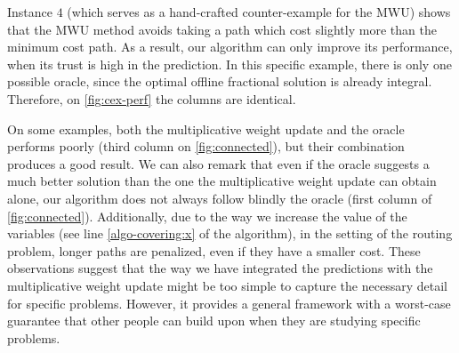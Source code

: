 Instance $4$ (which serves as a hand-crafted counter-example for the MWU) shows that the MWU method avoids taking a path which cost slightly more than the minimum cost path. As a result, our algorithm can only improve its performance, when its trust is high in the prediction. In this specific example, there is only one possible oracle, since the optimal offline fractional solution is already integral. Therefore, on \cref{fig:cex-perf} the columns are identical.

On some examples, both the multiplicative weight update and the oracle performs poorly (third column on \cref{fig:connected}), but their combination produces a good result. We can also remark that even if the oracle suggests a much better solution than the one the multiplicative weight update can obtain alone, our algorithm does not always follow blindly the oracle (first column of \cref{fig:connected}). Additionally, due to the way we increase the value of the variables (see line \ref{algo-covering:x} of the algorithm), in the setting of the routing problem, longer paths are penalized, even if they have a smaller cost. These observations suggest that the way we have integrated the predictions with the multiplicative weight update might be too simple to capture the necessary detail for specific problems. However, it provides a general framework with a worst-case guarantee that other people can build upon when they are studying specific problems.

